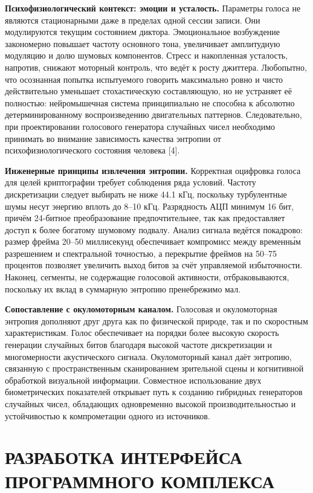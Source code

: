 \documentclass[14pt, a4paper]{extreport}
\let\oldchapter\chapter
\renewcommand{\chapter}{%
  \setcounter{subsection}{0}%
  \oldchapter%
}
\begin{document}
\textbf{Психофизиологический контекст: эмоции и усталость.} Параметры голоса не являются стационарными даже в пределах одной сессии записи. Они модулируются текущим состоянием диктора. Эмоциональное возбуждение закономерно повышает частоту основного тона, увеличивает амплитудную модуляцию и долю шумовых компонентов. Стресс и накопленная усталость, напротив, снижают моторный контроль, что ведёт к росту джиттера. Любопытно, что осознанная попытка испытуемого говорить максимально ровно и чисто действительно уменьшает стохастическую составляющую, но не устраняет её полностью: нейромышечная система принципиально не способна к абсолютно детерминированному воспроизведению двигательных паттернов. Следовательно, при проектировании голосового генератора случайных чисел необходимо принимать во внимание зависимость качества энтропии от психофизиологического состояния человека [4].

\textbf{Инженерные принципы извлечения энтропии.} Корректная оцифровка голоса для целей криптографии требует соблюдения ряда условий. Частоту дискретизации следует выбирать не ниже 44.1 кГц, поскольку турбулентные шумы несут энергию вплоть до 8–10 кГц. Разрядность АЦП минимум 16 бит, причём 24-битное преобразование предпочтительнее, так как предоставляет доступ к более богатому шумовому подвалу. Анализ сигнала ведётся покадрово: размер фрейма 20–50 миллисекунд обеспечивает компромисс между временны́м разрешением и спектральной точностью, а перекрытие фреймов на 50–75 процентов позволяет увеличить выход битов за счёт управляемой избыточности. Наконец, сегменты, не содержащие голосовой активности, отбраковываются, поскольку их вклад в суммарную энтропию пренебрежимо мал.

\textbf{Сопоставление с окуломоторным каналом.} Голосовая и окуломоторная энтропия дополняют друг друга как по физической природе, так и по скоростным характеристикам. Голос обеспечивает на порядки более высокую скорость генерации случайных битов  благодаря высокой частоте дискретизации и многомерности акустического сигнала. Окуломоторный канал даёт энтропию, связанную с пространственным сканированием зрительной сцены и когнитивной обработкой визуальной информации. Совместное использование двух биометрических показателей открывает путь к созданию гибридных генераторов случайных чисел, обладающих одновременно высокой производительностью и устойчивостью к компрометации одного из источников.


\chapter{РАЗРАБОТКА ИНТЕРФЕЙСА ПРОГРАММНОГО КОМПЛЕКСА}
\end{document}
